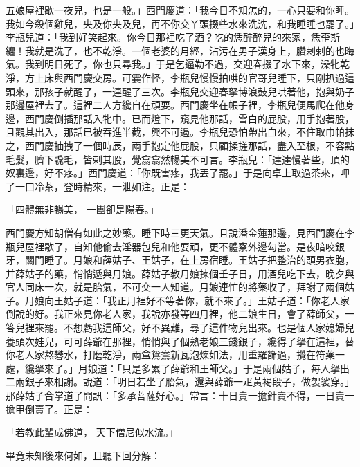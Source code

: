 五娘屋裡歇一夜兒，也是一般。」西門慶道：「我今日不知怎的，一心只要和你睡。我如今殺個雞兒，央及你央及兒，再不你交丫頭掇些水來洗洗，和我睡睡也罷了。」李瓶兒道：「我到好笑起來。你今日那裡吃了酒？吃的恁醉醉兒的來家，恁歪斯纏！我就是洗了，也不乾淨。一個老婆的月經，沾污在男子漢身上，臢剌剌的也晦氣。我到明日死了，你也只尋我。」于是乞逼勒不過，交迎春掇了水下來，澡牝乾淨，方上床與西門慶交房。可霎作怪，李瓶兒慢慢拍哄的官哥兒睡下，只剛扒過這頭來，那孩子就醒了，一連醒了三次。李瓶兒交迎春拏博浪鼓兒哄著他，抱與奶子那邊屋裡去了。這裡二人方纔自在頑耍。西門慶坐在帳子裡，李瓶兒便馬爬在他身邊，西門慶倒插那話入牝中。已而燈下，窺見他那話，雪白的屁股，用手抱著股，且觀其出入，那話已被吞進半截，興不可遏。李瓶兒恐怕帶出血來，不住取巾帕抹之，西門慶抽拽了一個時辰，兩手抱定他屁股，只顧揉搓那話，盡入至根，不容點毛髮，臍下毳毛，皆剌其股，覺翕翕然暢美不可言。李瓶兒：「達達慢著些，頂的奴裏邊，好不疼。」西門慶道：「你既害疼，我丟了罷。」于是向卓上取過茶來，呷了一口冷茶，登時精來，一泄如注。正是：

「四體無非暢美，  一團卻是陽春。」

西門慶方知胡僧有如此之妙藥。睡下時三更天氣。且說潘金蓮那邊，見西門慶在李瓶兒屋裡歇了，自知他偷去淫器包兒和他耍頑，更不體察外邊勾當。是夜暗咬銀牙，關門睡了。月娘和薛姑子、王姑子，在上房宿睡。王姑子把整治的頭男衣胞，并薛姑子的藥，悄悄遞與月娘。薛姑子教月娘揀個壬子日，用酒兒吃下去，晚夕與官人同床一次，就是胎氣，不可交一人知道。月娘連忙的將藥收了，拜謝了兩個姑子。月娘向王姑子道：「我正月裡好不等著你，就不來了。」王姑子道：「你老人家倒說的好。我正來見你老人家，我說亦發等四月裡，他二娘生日，會了薛師父，一答兒裡來罷。不想虧我這師父，好不異難，尋了這件物兒出來。也是個人家媳婦兒養頭次娃兒，可可薛爺在那裡，悄悄與了個熟老娘三錢銀子，纔得了拏在這裡，替你老人家熬礬水，打磨乾淨，兩盒鴛鴦新瓦泡煉如法，用重羅篩過，攪在符藥一處，纔拏來了。」月娘道：「只是多累了薛爺和王師父。」于是兩個姑子，每人拏出二兩銀子來相謝。說道：「明日若坐了胎氣，還與薛爺一疋黃褐段子，做袈裟穿。」那薛姑子合掌道了問訊：「多承菩薩好心。」常言：十日賣一擔針賣不得，一日賣一擔甲倒賣了。正是：

「若教此輩成佛道，  天下僧尼似水流。」

畢竟未知後來何如，且聽下回分解：
